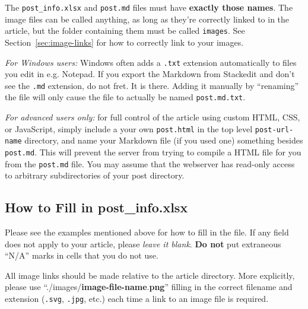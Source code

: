 \documentclass[paper=a4, fontsize=11pt]{scrartcl}
\numberwithin{equation}{section}        %
\numberwithin{figure}{section}            %
\numberwithin{table}{section}                %
\begin{document}
The \texttt{post\_info.xlsx} and \texttt{post.md} files must have
\textbf{exactly those names}. The image files can be called anything, as long as
they're correctly linked to in the article, but the
folder containing them must be called \texttt{images}. See Section~\ref{sec:image-links}
for how to correctly link to your images.

\emph{For Windows users:} Windows often adds a \texttt{.txt} extension
automatically to files you edit in e.g. Notepad. If you export the Markdown from
Stackedit and don't see the \texttt{.md} extension, do not fret. It is there.
Adding it manually by ``renaming'' the file will only cause the file to actually
be named \texttt{post.md.txt}.

\emph{For advanced users only:} for full control of the article using custom
HTML, CSS, or JavaScript, simply include a your own \texttt{post.html} in
the top level \texttt{post-url-name} directory, and name your Markdown file (if
you used one) something besides \texttt{post.md}. This will prevent the server
from trying to compile a HTML file for you from the \texttt{post.md} file.
You may assume that the webserver has read-only access to arbitrary
subdirectories of your post directory.

\subsection{How to Fill in post\_info.xlsx}\label{sec:excel}
Please see the examples mentioned above for how to fill in the file. If any
field does not apply to your article, please \textit{leave it blank}. \textbf{Do
not} put extraneous ``N/A'' marks in cells that you do not use.

All image links should be made relative to the article
directory. More explicitly, please use
``./images/\textbf{image-file-name}.\textbf{png}''
filling in the correct filename and extension (\texttt{.svg}, \texttt{.jpg},
etc.) each time a link to an image file is required.
\end{document}
